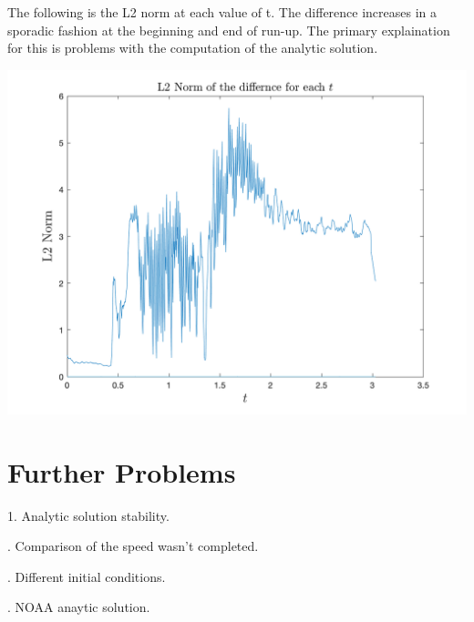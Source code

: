 \documentclass{article}
\begin{document}
\noindent The following is the L2 norm at each value of t. The difference increases in a sporadic fashion at the beginning and end of run-up. The primary explaination for this is problems with the computation of the analytic solution.


\includegraphics[width=\linewidth]{l2.png}

\section{Further Problems}

1. Analytic solution stability.

. Comparison of the speed wasn't completed.

. Different initial conditions.

. NOAA anaytic solution.
\end{document}
